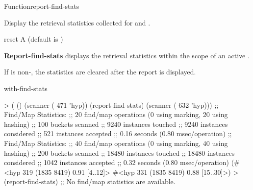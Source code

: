 \documentclass[10pt,twoside,english,pdftex]{article}
\begin{document}
\begin{functiondoc}{Function}{report-find-stats}{ }
%
%
%
  
\fnsyntax

\fnpurpose 
{}%
%
Display the retrieval statistics collected for
\textbf{} and
\textbf{}.

\fnpackage {}

\fnmodule {}

\fnargs
\begin{args}{reset}
\arg[reset] A  (default is \nil)
\end{args}

\fndescription 
{}%
\textbf{Report-find-stats} displays the retrieval statistics within
the scope of an active \textbf{}.

If  is non-\nil, the statistics are cleared after the
report is displayed.

\begin{alsos}{with-find-stats}
\end{alsos}

%
%
\fnexamples
%
\W\supp
\begin{example}
> ( ()
    (scanner ( 471 'hyp))
    (report-find-stats)
    (scanner ( 632 'hyp)))
;; Find/Map Statistics:
;;        20 find/map operations (0 using marking, 20 using hashing)
;;       100 buckets scanned
;;      9240 instances touched
;;      9240 instances considered
;;       521 instances accepted
;;      0.16 seconds (0.80 msec/operation)
;; Find/Map Statistics:
;;        40 find/map operations (0 using marking, 40 using hashing)
;;       200 buckets scanned
;;     18480 instances touched
;;     18480 instances considered
;;      1042 instances accepted
;;      0.32 seconds (0.80 msec/operation)
(#<hyp 319 (1835 8419) 0.91 [4..12]>
 #<hyp 331 (1835 8419) 0.88 [15..30]>)
> (report-find-stats)
;; No find/map statistics are available.
\end{example}

\end{functiondoc}
\end{document}
